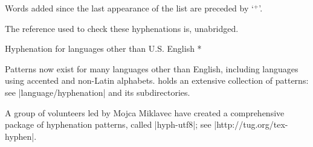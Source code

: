 Words added since the last appearance of the list are preceded by `${}^+$'.

The reference used to check these hyphenations is, unabridged.

%
%


%

\head * Hyphenation for languages \break other than U.S. English *

Patterns now exist for many languages other than  English,
including languages using accented and non-Latin alphabets.
{\CTAN} holds an extensive collection of patterns: see
|language/hyphenation| and its subdirectories.

A group of volunteers led by Mojca Miklavec
have created a comprehensive package of hyphenation patterns, called
|hyph-utf8|; see\newline
|http://tug.org/tex-hyphen|.

